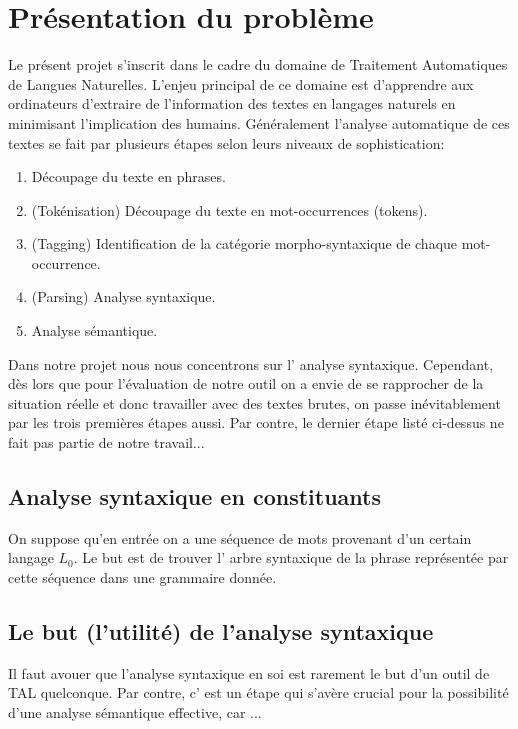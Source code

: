 \documentclass[12pt]{article}
\begin{document}
\section{Pr\'esentation du probl\`eme}

Le pr\'esent projet s'inscrit dans le cadre du domaine de Traitement Automatiques de Langues Naturelles. L'enjeu principal de ce domaine est d'apprendre aux ordinateurs d'extraire de l'information des textes en langages naturels en minimisant l'implication des humains. G\'en\'eralement l'analyse automatique de ces textes se fait par plusieurs \'etapes selon leurs niveaux de sophistication:
\begin{enumerate}
\item D\'ecoupage du texte en phrases.
\item (Tok\'enisation) D\'ecoupage du texte en mot-occurrences (tokens).
\item (Tagging) Identification de la cat\'egorie morpho-syntaxique de chaque mot-occurrence.
\item (Parsing) Analyse syntaxique.
\item Analyse s\'emantique.
\end{enumerate}

Dans notre projet nous nous concentrons sur l' analyse syntaxique. Cependant, d\`es lors que pour l'\'evaluation de notre outil on a envie de se rapprocher de la situation r\'eelle et donc travailler avec des textes brutes, on passe in\'evitablement par les trois premi\`eres \'etapes aussi. Par contre, le dernier \'etape list\'e ci-dessus ne fait pas partie de notre travail...

\subsection{Analyse syntaxique en constituants}
 On suppose qu'en entr\'ee on a une s\'equence de mots provenant d'un certain langage $L_0$. Le but est de trouver l' arbre syntaxique de la phrase repr\'esent\'ee par cette s\'equence dans une grammaire donn\'ee.

\subsection{Le but (l'utilit\'e) de l'analyse syntaxique}

Il faut avouer que l'analyse syntaxique en soi est rarement le but d'un outil de TAL quelconque. Par contre, c' est un \'etape qui s'av\`ere crucial pour la possibilit\'e d'une analyse s\'emantique effective, car ...
\end{document}

